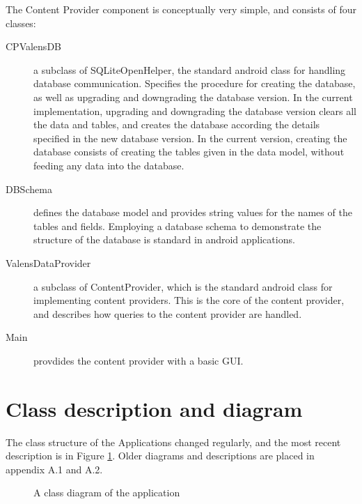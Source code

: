 The Content Provider component is conceptually very simple, and consists of four classes:
\begin{description}
\item[CPValensDB]
a subclass of SQLiteOpenHelper, the standard android class for handling database communication. Specifies the procedure for creating the database, as well as upgrading and downgrading the database version. In the current implementation, upgrading and downgrading the database version clears all the data and tables, and creates the database according the details specified in the new database version. In the current version, creating the database consists of creating the tables given in the data model, without feeding any data into the database.
\item[DBSchema]
defines the database model and provides string values for the names of the tables and fields. Employing a database schema to demonstrate the structure of the database is standard in android applications.
\item[ValensDataProvider]
a subclass of ContentProvider, which is the standard android class for implementing content providers. This is the core of the content provider, and describes how queries to the content provider are handled.
\item[Main]
provdides the content provider with a basic GUI.
\end{description}


\section{Class description and diagram}

The class structure of the Applications changed regularly, and the most recent description is in Figure \ref{fig:ClassDiagram}. Older diagrams and descriptions are placed in appendix A.1 and A.2. 
\begin{figure}[p]

\caption{A class diagram of the application}
\label{fig:ClassDiagram}

\setlength\fboxsep{0pt}
\setlength\fboxrule{1pt}

\end{figure}

